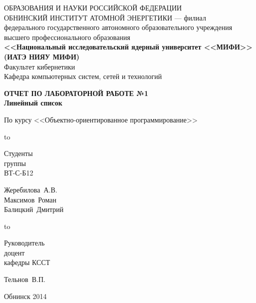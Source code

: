
\begin{titlepage}
\newpage

\begin{center}
{\small{} ОБРАЗОВАНИЯ И НАУКИ РОССИЙСКОЙ ФЕДЕРАЦИИ\\
ОБНИНСКИЙ ИНСТИТУТ АТОМНОЙ ЭНЕРГЕТИКИ --- филиал}\\
федерального государственного автономного образовательного учреждения\\
высшего профессионального образования\\
{\bf<<Национальный исследовательский ядерный университет <<МИФИ>>\\
(ИАТЭ НИЯУ МИФИ)}\\
\vspace{2em}
Факультет кибернетики\\
Кафедра компьютерных систем, сетей и технологий
\end{center}
\vspace{2em}


\vspace{5em}
\begin{center}
\textbf{ОТЧЕТ ПО ЛАБОРАТОРНОЙ РАБОТЕ №1\\Линейный список}
\end{center}


\begin{center}
По курсу <<Объектно-ориентированное программирование>>
\end{center}

\vspace{6em}

\hbox to \textwidth
{\parbox{6 cm}{Студенты\\ группы\\ ВТ-С-Б12}\dotfill \parbox{4 cm}{
\begin{flushright}Жеребилова~А.В.\\ Максимов~Роман\\ Балицкий~Дмитрий\end{flushright}}}
\vspace{2em}

\hbox to \textwidth
{\parbox{6 cm}{Руководитель\\доцент\\ кафедры КССТ}\dotfill \parbox{4 cm}{
\begin{flushright}Тельнов~В.П.\end{flushright}}}
\vspace{2em}



\vspace{\fill}

\begin{center}
Обнинск 2014
\end{center}

\end{titlepage}